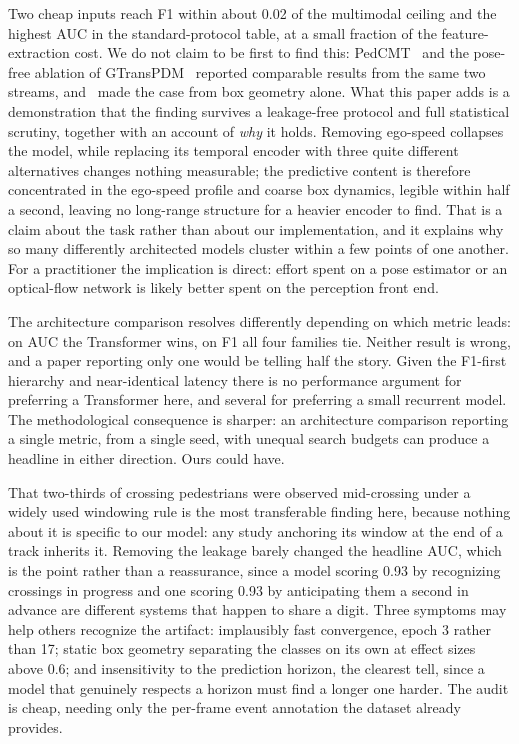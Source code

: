 \documentclass[mti,article,submit,moreauthors]{Definitions/mdpi}
\begin{document}
Two cheap inputs reach F1 within about 0.02 of the multimodal ceiling and the highest AUC in the standard-protocol table, at a small fraction of the feature-extraction cost. We do not claim to be first to find this: PedCMT~\citep{chen2024pedcmt} and the pose-free ablation of GTransPDM~\citep{xie2025gtranspdm} reported comparable results from the same two streams, and~\citet{achaji2022attention} made the case from box geometry alone. What this paper adds is a demonstration that the finding survives a leakage-free protocol and full statistical scrutiny, together with an account of \emph{why} it holds. Removing ego-speed collapses the model, while replacing its temporal encoder with three quite different alternatives changes nothing measurable; the predictive content is therefore concentrated in the ego-speed profile and coarse box dynamics, legible within half a second, leaving no long-range structure for a heavier encoder to find. That is a claim about the task rather than about our implementation, and it explains why so many differently architected models cluster within a few points of one another. For a practitioner the implication is direct: effort spent on a pose estimator or an optical-flow network is likely better spent on the perception front end.

The architecture comparison resolves differently depending on which metric leads: on AUC the Transformer wins, on F1 all four families tie. Neither result is wrong, and a paper reporting only one would be telling half the story. Given the F1-first hierarchy and near-identical latency there is no performance argument for preferring a Transformer here, and several for preferring a small recurrent model. The methodological consequence is sharper: an architecture comparison reporting a single metric, from a single seed, with unequal search budgets can produce a headline in either direction. Ours could have.

That two-thirds of crossing pedestrians were observed mid-crossing under a widely used windowing rule is the most transferable finding here, because nothing about it is specific to our model: any study anchoring its window at the end of a track inherits it. Removing the leakage barely changed the headline AUC, which is the point rather than a reassurance, since a model scoring 0.93 by recognizing crossings in progress and one scoring 0.93 by anticipating them a second in advance are different systems that happen to share a digit. Three symptoms may help others recognize the artifact: implausibly fast convergence, epoch 3 rather than 17; static box geometry separating the classes on its own at effect sizes above 0.6; and insensitivity to the prediction horizon, the clearest tell, since a model that genuinely respects a horizon must find a longer one harder. The audit is cheap, needing only the per-frame event annotation the dataset already provides.
\end{document}
